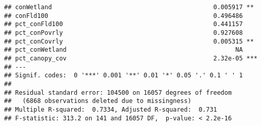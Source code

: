 \documentclass[]{article}
\begin{document}
\begin{verbatim}
## conWetland                                            0.005917 ** 
## conFld100                                             0.496486    
## pct_conFld100                                         0.441157    
## pct_conPovrly                                         0.927608    
## pct_conCovrly                                         0.005315 ** 
## pct_conWetland                                              NA    
## pct_canopy_cov                                        2.32e-05 ***
## ---
## Signif. codes:  0 '***' 0.001 '**' 0.01 '*' 0.05 '.' 0.1 ' ' 1
## 
## Residual standard error: 104500 on 16057 degrees of freedom
##   (6868 observations deleted due to missingness)
## Multiple R-squared:  0.7334, Adjusted R-squared:  0.731 
## F-statistic: 313.2 on 141 and 16057 DF,  p-value: < 2.2e-16
\end{verbatim}
\end{document}
